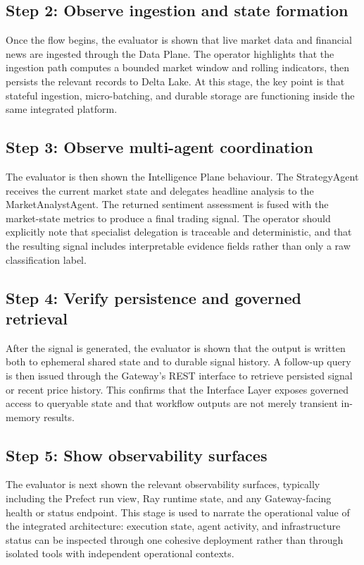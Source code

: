 \documentclass[12pt, a4paper]{report}
\begin{document}
\subsection*{Step 2: Observe ingestion and state formation}
Once the flow begins, the evaluator is shown that live market data and financial news
are ingested through the Data Plane. The operator highlights that the ingestion path
computes a bounded market window and rolling indicators, then persists the relevant
records to Delta Lake. At this stage, the key point is that stateful ingestion,
micro-batching, and durable storage are functioning inside the same integrated
platform.

\subsection*{Step 3: Observe multi-agent coordination}
The evaluator is then shown the Intelligence Plane behaviour. The StrategyAgent
receives the current market state and delegates headline analysis to the
MarketAnalystAgent. The returned sentiment assessment is fused with the market-state
metrics to produce a final trading signal. The operator should explicitly note that
specialist delegation is traceable and deterministic, and that the resulting signal
includes interpretable evidence fields rather than only a raw classification label.

\subsection*{Step 4: Verify persistence and governed retrieval}
After the signal is generated, the evaluator is shown that the output is written both
to ephemeral shared state and to durable signal history. A follow-up query is then
issued through the Gateway's REST interface to retrieve persisted signal or recent
price history. This confirms that the Interface Layer exposes governed access to
queryable state and that workflow outputs are not merely transient in-memory results.

\subsection*{Step 5: Show observability surfaces}
The evaluator is next shown the relevant observability surfaces, typically including
the Prefect run view, Ray runtime state, and any Gateway-facing health or status
endpoint. This stage is used to narrate the operational value of the integrated
architecture: execution state, agent activity, and infrastructure status can be
inspected through one cohesive deployment rather than through isolated tools with
independent operational contexts.
\end{document}
